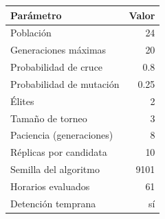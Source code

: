 \begin{tabular}{lr}
\toprule
Parámetro & Valor \\
\midrule
Población & 24 \\
Generaciones máximas & 20 \\
Probabilidad de cruce & 0.8 \\
Probabilidad de mutación & 0.25 \\
Élites & 2 \\
Tamaño de torneo & 3 \\
Paciencia (generaciones) & 8 \\
Réplicas por candidata & 10 \\
Semilla del algoritmo & 9101 \\
Horarios evaluados & 61 \\
Detención temprana & sí \\
\bottomrule
\end{tabular}

